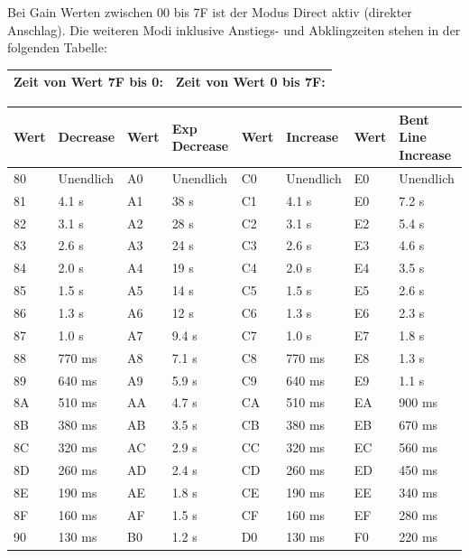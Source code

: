 \bigskip

Bei Gain Werten zwischen 00 bis 7F ist der Modus Direct aktiv (direkter Anschlag).
Die weiteren Modi inklusive Anstiegs- und Abklingzeiten stehen in der folgenden Tabelle:

\bigskip

\begin{table}[htbp]
\begin{tabularx}{\textwidth}{|X|X|}
	\hline
	Zeit von Wert 7F bis 0: & Zeit von Wert 0 bis 7F: \\
	\hline
\end{tabularx}

\begin{tabularx}{\textwidth}{|l|X|l|X|l|X|l|X|}
	\hline
	Wert & Decrease & Wert & Exp Decrease & Wert & Increase & Wert & Bent Line Increase \\
	\hline
	80 & Unendlich & A0 & Unendlich & C0 & Unendlich & E0 & Unendlich \\
	\hline
	81 & 4.1 s & A1 & 38 s & C1 & 4.1 s & E0 & 7.2 s \\
	\hline
	82 & 3.1 s & A2 & 28 s & C2 & 3.1 s & E2 & 5.4 s \\
	\hline
	83 & 2.6 s & A3 & 24 s & C3 & 2.6 s & E3 & 4.6 s \\
	\hline
	84 & 2.0 s & A4 & 19 s & C4 & 2.0 s & E4 & 3.5 s \\
	\hline
	85 & 1.5 s & A5 & 14 s & C5 & 1.5 s & E5 & 2.6 s \\
	\hline
	86 & 1.3 s & A6 & 12 s & C6 & 1.3 s & E6 & 2.3 s \\
	\hline
	87 & 1.0 s & A7 & 9.4 s & C7 & 1.0 s & E7 & 1.8 s \\
	\hline
	88 & 770 ms & A8 & 7.1 s & C8 & 770 ms & E8 & 1.3 s \\
	\hline
	89 & 640 ms & A9 & 5.9 s & C9 & 640 ms & E9 & 1.1 s \\
	\hline
	8A & 510 ms & AA & 4.7 s & CA & 510 ms & EA & 900 ms \\
	\hline
	8B & 380 ms & AB & 3.5 s & CB & 380 ms & EB & 670 ms \\
	\hline
	8C & 320 ms & AC & 2.9 s & CC & 320 ms & EC & 560 ms \\
	\hline
	8D & 260 ms & AD & 2.4 s & CD & 260 ms & ED & 450 ms \\
	\hline
	8E & 190 ms & AE & 1.8 s & CE & 190 ms & EE & 340 ms \\
	\hline
	8F & 160 ms & AF & 1.5 s & CF & 160 ms & EF & 280 ms \\
	\hline
	90 & 130 ms & B0 & 1.2 s & D0 & 130 ms & F0 & 220 ms \\

\end{tabularx}
\end{table}
